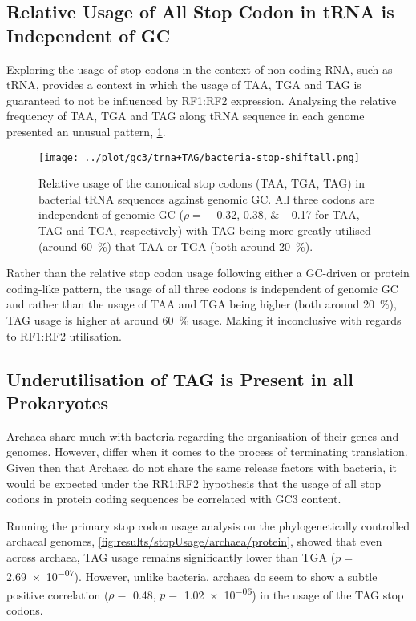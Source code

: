 \documentclass[../main.tex]{subfile}
\begin{document}
    \subsection{Relative Usage of All Stop Codon in tRNA is Independent of GC}
        Exploring the usage of stop codons in the context of non-coding RNA, such as tRNA, provides a context in which the usage of TAA, TGA and TAG is guaranteed to not be influenced by RF1:RF2 expression. Analysing the relative frequency of TAA, TGA and TAG along tRNA sequence in each genome presented an unusual pattern, \cref{fig:results/bacteria/tRNA}.

        \begin{figure}[H]
            \centering
            \texttt{[image: ../plot/gc3/trna+TAG/bacteria-stop-shiftall.png]}
            \caption{%
                Relative usage of the canonical stop codons (TAA, TGA, TAG) in bacterial tRNA sequences against genomic GC. All three codons are independent of genomic GC ($\rho =$ \numlist{-0.32;0.38;-0.17} for TAA, TAG and TGA, respectively) with TAG being more greatly utilised (around \SI{60}{\percent}) that TAA or TGA (both around \SI{20}{\percent}).
            }
            \label{fig:results/bacteria/tRNA}
        \end{figure}

        Rather than the relative stop codon usage following either a GC-driven or protein coding-like pattern, the usage of all three codons is independent of genomic GC and rather than the usage of TAA and TGA being higher (both around \SI{20}{\percent}), TAG usage is higher at around \SI{60}{\percent} usage. Making it inconclusive with regards to RF1:RF2 utilisation.

    \subsection{Underutilisation of TAG is Present in all Prokaryotes}
        Archaea share much with bacteria regarding the organisation of their genes and genomes. However, differ when it comes to the process of terminating translation.  Given then that Archaea do not share the same release factors with bacteria, it would be expected under the RR1:RF2 hypothesis that the usage of all stop codons in protein coding sequences be correlated with GC3 content.

        Running the primary stop codon usage analysis on the phylogenetically controlled archaeal genomes, \cref{fig:results/stopUsage/archaea/protein}, showed that even across archaea, TAG usage remains significantly lower than TGA ($p=$ \num{2.69e-07}). However, unlike bacteria, archaea do seem to show a subtle positive correlation ($\rho=$ \num{0.48}, $p=$ \num{1.02e-06}) in the usage of the TAG stop codons.
\end{document}
